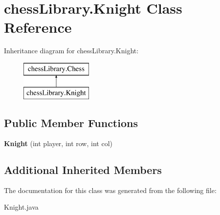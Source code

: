 \hypertarget{classchess_library_1_1_knight}{}\section{chess\+Library.\+Knight Class Reference}
\label{classchess_library_1_1_knight}
Inheritance diagram for chess\+Library.\+Knight\+:\begin{figure}[H]
\begin{center}
\leavevmode
\includegraphics[height=2.000000cm]{classchess_library_1_1_knight}
\end{center}
\end{figure}
\subsection*{Public Member Functions}
\begin{DoxyCompactItemize}
\item 
\mbox{\label{classchess_library_1_1_knight_a91cb9e4f33edf5ad275dccdd10199694}} 
{\bfseries Knight} (int player, int row, int col)
\end{DoxyCompactItemize}
\subsection*{Additional Inherited Members}


The documentation for this class was generated from the following file\+:\begin{DoxyCompactItemize}
\item 
Knight.\+java\end{DoxyCompactItemize}
